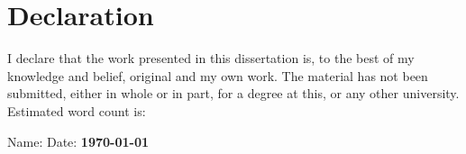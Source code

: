 \section*{\centering Declaration} \vspace{24pt}

I declare that the work presented in this dissertation is, to the best of my knowledge and belief, original and my own work. The material has not been submitted, either in whole or in part, for a degree at this, or any other university. Estimated word count is: \textbf{}\vspace{24pt} 

\noindent Name: \textbf{\authorname} \newline
\noindent Date: \textbf{\monthyeardate\today}
